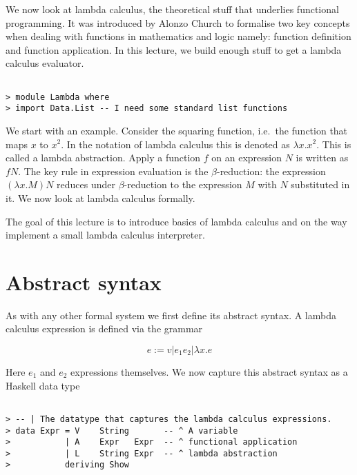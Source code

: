 \documentclass{article}
\begin{document}


We now look at lambda calculus, the theoretical stuff that underlies
functional programming. It was introduced by Alonzo Church to formalise
two key concepts when dealing with functions in mathematics and logic
namely: function definition and function application. In this lecture,
we build enough stuff to get a lambda calculus evaluator.

\begin{verbatim}

> module Lambda where
> import Data.List -- I need some standard list functions
\end{verbatim}
We start with an example. Consider the squaring function, i.e.~the
function that maps $x$ to $x^2$. In the notation of lambda calculus this
is denoted as $\lambda x . x^2$. This is called a lambda abstraction.
Apply a function $f$ on an expression $N$ is written as $f N$. The key
rule in expression evaluation is the $\beta$-reduction: the expression
$(\lambda x. M) N$ reduces under $\beta$-reduction to the expression $M$
with $N$ substituted in it. We now look at lambda calculus formally.

The goal of this lecture is to introduce basics of lambda calculus and
on the way implement a small lambda calculus interpreter.

\section{Abstract syntax}

As with any other formal system we first define its abstract syntax. A
lambda calculus expression is defined via the grammar

\[ e := v | e_1 e_2 | \lambda x . e \]

Here $e_1$ and $e_2$ expressions themselves. We now capture this
abstract syntax as a Haskell data type

\begin{verbatim}

> -- | The datatype that captures the lambda calculus expressions.
> data Expr = V    String       -- ^ A variable
>           | A    Expr   Expr  -- ^ functional application
>           | L    String Expr  -- ^ lambda abstraction
>           deriving Show
\end{verbatim}
\end{document}

